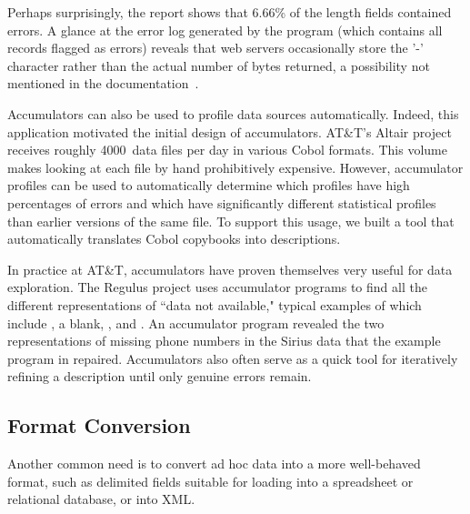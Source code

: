 \documentclass[times]{acm-sigplan}
\newcommand{\dibbler}{Sirius}
\newcommand{\ningaui}{Altair}
\newcommand{\darkstar}{Regulus}
\begin{document}
Perhaps surprisingly, the report shows that 6.66\% of the length
fields contained errors.  A glance at the error log generated
by the program (which contains all records flagged as errors) 
reveals that web servers occasionally store the '-' character
rather than the actual number of bytes returned, a possibility
not mentioned in the documentation~\cite{wpp}.

Accumulators can also be used to profile data sources automatically.
Indeed, this application motivated the initial design of accumulators.
AT\&T's \ningaui{} project receives roughly 4000~data files per day in various
Cobol formats.  This volume makes looking at each file by hand 
prohibitively expensive.  However, accumulator profiles can be used to 
automatically determine
which profiles have high percentages of errors and which have significantly
different statistical profiles than earlier versions of the same file.  
To support this usage, we built a tool that automatically translates
Cobol copybooks into \pads{} descriptions.

In practice at AT\&T, accumulators have proven themselves very useful for
data exploration.  The \darkstar{} project uses \pads{} accumulator programs
to find all the different representations of ``data not available,"  typical 
examples of which include , a blank, , and .
An accumulator program revealed the two representations
of missing phone numbers in the \dibbler{} data that the example program
in  repaired.
Accumulators also often serve as a quick tool for iteratively
refining a \pads{} description until only genuine errors remain.

\subsection{Format Conversion}
Another common need is to convert ad hoc data into a more well-behaved format, such as delimited fields suitable for loading into a spreadsheet or relational database, or into XML.  
\end{document}

